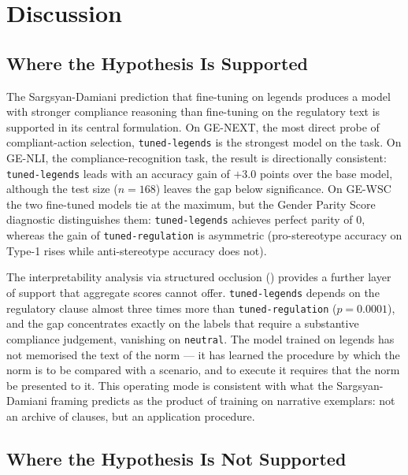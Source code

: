 \documentclass[pdflatex, sn-apa]{sn-jnl}%
\theoremstyle{thmstyleone}%
\theoremstyle{thmstyletwo}%
\theoremstyle{thmstylethree}%
\newcommand{\modellegends}{\texttt{tuned-legends}}
\newcommand{\modelreg}{\texttt{tuned-regulation}}
\begin{document}
\FloatBarrier


\section{Discussion}
\label{sec:discussion}

\subsection{Where the Hypothesis Is Supported}
\label{sec:disc:supported}

The Sargsyan-Damiani prediction that fine-tuning on legends produces a model with
stronger compliance reasoning than fine-tuning on the regulatory text is
supported in its central formulation. On GE-NEXT, the most direct probe of
compliant-action selection, \modellegends{} is the strongest model on the task. On
GE-NLI, the compliance-recognition task, the result is directionally consistent:
\modellegends{} leads with an accuracy gain of $+3.0$ points over the base model,
although the test size ($n=168$) leaves the gap below significance. On GE-WSC the
two fine-tuned models tie at the maximum, but the Gender Parity Score diagnostic
distinguishes them: \modellegends{} achieves perfect parity of 0, whereas the gain
of \modelreg{} is asymmetric (pro-stereotype accuracy on Type-1 rises while
anti-stereotype accuracy does not).

The interpretability analysis via structured occlusion () provides
a further layer of support that aggregate scores cannot offer. \modellegends{}
depends on the regulatory clause almost three times more than \modelreg{}
($p = 0.0001$), and the gap concentrates exactly on the labels that require a
substantive compliance judgement, vanishing on \texttt{neutral}. The model
trained on legends has not memorised the text of the norm --- it has learned the
procedure by which the norm is to be compared with a scenario, and to execute it
requires that the norm be presented to it. This operating mode is consistent with
what the Sargsyan-Damiani framing predicts as the product of training on
narrative exemplars: not an archive of clauses, but an application procedure.


\subsection{Where the Hypothesis Is Not Supported}
\label{sec:disc:notsupported}
\end{document}

